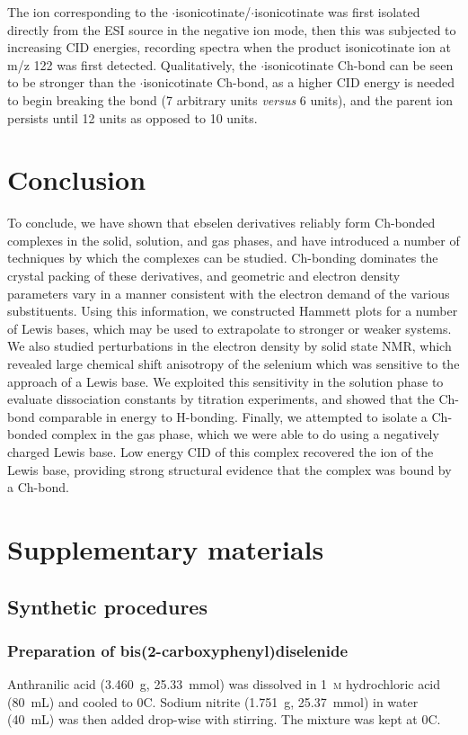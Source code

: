 \begin{refsection}
The ion corresponding to the $ \cdot $isonicotinate/$ \cdot $isonicotinate was first isolated directly from the ESI source in the negative ion mode, then this was subjected to increasing CID energies, recording spectra when the product isonicotinate ion at m/z 122 was first detected.
Qualitatively, the $ \cdot $isonicotinate Ch-bond can be seen to be stronger than the $ \cdot $isonicotinate Ch-bond, as a higher CID energy is needed to begin breaking the bond (7 arbitrary units \emph{versus} 6 units), and the parent ion persists until 12 units as opposed to 10 units.

\section{Conclusion}
To conclude, we have shown that ebselen derivatives reliably form Ch-bonded complexes in the solid, solution, and gas phases, and have introduced a number of techniques by which the complexes can be studied.
Ch-bonding dominates the crystal packing of these derivatives, and geometric and electron density parameters vary in a manner consistent with the electron demand of the various substituents.
Using this information, we constructed Hammett plots for a number of Lewis bases, which may be used to extrapolate to stronger or weaker systems.
We also studied perturbations in the electron density by solid state NMR, which revealed large chemical shift anisotropy of the selenium which was sensitive to the approach of a Lewis base.
We exploited this sensitivity in the solution phase to evaluate dissociation constants by titration experiments, and showed that the Ch-bond comparable in energy to H-bonding.
Finally, we attempted to isolate a Ch-bonded complex in the gas phase, which we were able to do using a negatively charged Lewis base.
Low energy CID of this complex recovered the ion of the Lewis base, providing strong structural evidence that the complex was bound by a Ch-bond.

\section{Supplementary materials}

\subsection{Synthetic procedures}

\subsubsection[Preparation of \refcmpd{diselenide}]{Preparation of bis(2-carboxyphenyl)diselenide }\label{sec:diselenide_prep}
Anthranilic acid (3.460~g, 25.33~mmol) was dissolved in 1~\textsc{m} hydrochloric acid (80~mL) and cooled to 0\degree{}C.
Sodium nitrite (1.751~g, 25.37~mmol) in water (40~mL) was then added drop-wise with stirring.
The mixture was kept at 0\degree{}C.


\end{refsection}
